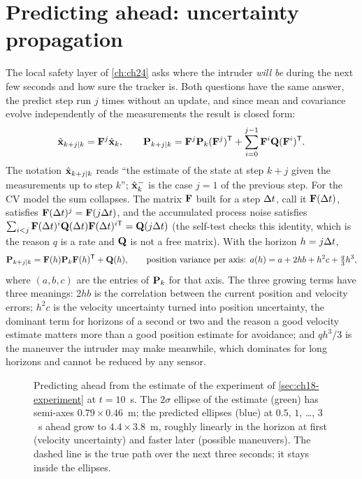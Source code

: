\section{Predicting ahead: uncertainty propagation}
\label{sec:ch18-prediction}

The local safety layer of \cref{ch:ch24} asks where the intruder \emph{will be}
during the next few seconds and how sure the tracker is. Both questions have
the same answer, the predict step run $j$ times without an update, and since
mean and covariance evolve independently of the measurements the result is
closed form:
\begin{equation}
  \hat{\mathbf{x}}_{k+j\mid k}=\mathbf{F}^{j}\hat{\mathbf{x}}_k,\qquad
  \mathbf{P}_{k+j\mid k}=\mathbf{F}^{j}\mathbf{P}_k(\mathbf{F}^{j})^{\mathsf{T}}+\sum_{i=0}^{j-1}\mathbf{F}^{i}\mathbf{Q}(\mathbf{F}^{i})^{\mathsf{T}} .
  \label{eq:ch18-ahead}
\end{equation}
The notation $\hat{\mathbf{x}}_{k+j\mid k}$ reads ``the estimate of the state
at step $k+j$ given the measurements up to step $k$''; $\hat{\mathbf{x}}^-_k$ is
the case $j=1$ of the previous step. For the CV model the sum collapses. The
matrix $\mathbf{F}$ built for a step $\Delta t$, call it $\mathbf{F}(\Delta t)$, satisfies
$\mathbf{F}(\Delta t)^j=\mathbf{F}(j\Delta t)$, and the accumulated process noise satisfies
$\sum_{i<j}\mathbf{F}(\Delta t)^i\mathbf{Q}(\Delta t)\mathbf{F}(\Delta t)^{i\mathsf{T}}=\mathbf{Q}(j\Delta t)$
(the self-test checks this identity, which is the reason $q$ is a rate and
$\mathbf{Q}$ is not a free matrix). With the horizon $h=j\Delta t$,
\begin{equation}
  \mathbf{P}_{k+j\mid k}=\mathbf{F}(h)\mathbf{P}_k\mathbf{F}(h)^{\mathsf{T}}+\mathbf{Q}(h),\qquad
  \text{position variance per axis: } a(h)=a+2hb+h^2c+\tfrac{q}{3}h^3 ,
  \label{eq:ch18-ahead-cv}
\end{equation}
where $(a,b,c)$ are the entries of $\mathbf{P}_k$ for that axis. The three
growing terms have three meanings: $2hb$ is the correlation between the
current position and velocity errors; $h^2c$ is the velocity uncertainty
turned into position uncertainty, the dominant term for horizons of a second
or two and the reason a good velocity estimate matters more than a good
position estimate for avoidance; and $qh^3/3$ is the maneuver the intruder
may make meanwhile, which dominates for long horizons and cannot be reduced
by any sensor.

\begin{figure}[tb]
  \centering
  \caption{Predicting ahead from the estimate of the experiment of
  \cref{sec:ch18-experiment} at $t=10$~s. The $2\sigma$ ellipse of the
  estimate (green) has semi-axes $0.79\times0.46$~m; the predicted ellipses
  (blue) at $0.5$, $1$, \dots, $3$~s ahead grow to $4.4\times3.8$~m, roughly
  linearly in the horizon at first (velocity uncertainty) and faster later
  (possible maneuvers). The dashed line is the true path over the next three
  seconds; it stays inside the ellipses.}
  \label{fig:ch18-prediction}
\end{figure}

